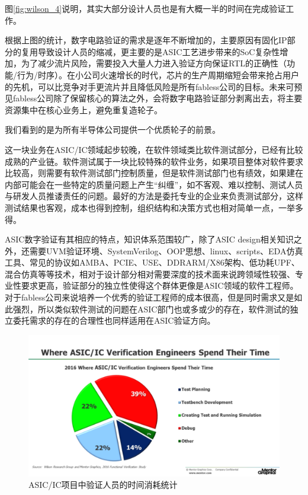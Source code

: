 \documentclass[a4paper,11pt]{article}
\begin{document}
图\ref{fig:wilson_4}说明，其实大部分设计人员也是有大概一半的时间在完成验证工作。

根据上图的统计，数字电路验证的需求是逐年不断增加的，主要原因有固化IP部分的复用导致设计人员的缩减，更主要的是ASIC工艺进步带来的SoC复杂性增加，为了减少流片风险，需要投入大量人力进入验证方向保证RTL的正确性（功能/行为/时序）。在小公司火速增长的时代，芯片的生产周期缩短会带来抢占用户的先机，可以比竞争对手更流片并且降低风险是所有fabless公司的目标。未来可预见fabless公司除了保留核心的算法之外，会将数字电路验证部分剥离出去，将主要资源集中在核心业务上，避免重复造轮子。

我们看到的是为所有半导体公司提供一个优质轮子的前景。

这一块业务在ASIC/IC领域起步较晚，在软件领域类比软件测试部分，已经有比较成熟的产业链。软件测试属于一块比较特殊的软件业务，如果项目整体对软件要求比较高，则需要有软件测试部门控制质量，但是软件测试部门也有绩效，如果建在内部可能会在一些特定的质量问题上产生“纠缠”，如不客观、难以控制、测试人员与研发人员推诿责任的问题。最好的方法是委托专业的企业来负责测试部分，这样测试结果也客观，成本也得到控制，组织结构和决策方式也相对简单一点，一举多得。

ASIC数字验证有其相应的特点，知识体系范围较广，除了ASIC design相关知识之外，还需要UVM验证环境、SystemVerilog、OOP思想、linux、scripts、EDA仿真工具、常见的协议如AMBA、PCIE、USE、DDRARM/X86架构、低功耗UPF、混合仿真等等技术，相对于设计部分相对需要深度的技术面来说跨领域性较强、专业性要求更高，验证部分的独立性使得这个群体更像是ASIC领域的软件工程师。对于fabless公司来说培养一个优秀的验证工程师的成本很高，但是同时需求又是如此强烈，所以类似软件测试的问题在ASIC部门也或多或少的存在，软件测试的独立委托需求的存在的合理性也同样适用在ASIC验证方向。

\begin{figure}[ht]
  \centering
  \includegraphics[width=0.8\linewidth]{images/wilson5.png}
  \caption{ASIC/IC项目中验证人员的时间消耗统计}
  \label{fig:wilson_5}
\end{figure}
\end{document}
